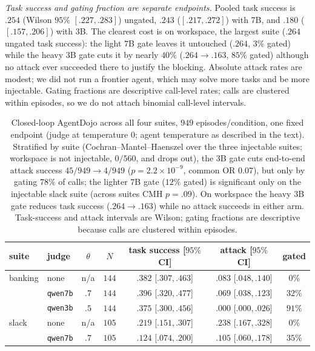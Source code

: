 \emph{Task success and gating fraction are separate endpoints.} Pooled task
success is $.254$ (Wilson $95\%$ $[.227,.283]$) ungated, $.243$
($[.217,.272]$) with 7B, and $.180$ ($[.157,.206]$) with 3B. The clearest cost is on
workspace, the largest suite ($.264$ ungated task success): the light $7$B gate
leaves it untouched ($.264$, $3\%$ gated) while the heavy $3$B gate cuts it by nearly
$40\%$ ($.264\to.163$, $85\%$ gated) although no attack ever succeeded there
to justify the blocking. Absolute attack rates are modest; we did not run a frontier agent, which may
solve more tasks and be more injectable. Gating fractions
are descriptive call-level rates; calls are clustered within episodes, so we do
not attach binomial call-level intervals.

\begin{table}[h]
\caption{Closed-loop AgentDojo across all four suites, $949$ episodes/condition, one fixed
endpoint (judge at temperature $0$; agent temperature as described in the text). Stratified by suite (Cochran--Mantel--Haenszel over the three
injectable suites; workspace is not injectable, $0/560$, and drops out), the $3$B gate
cuts end-to-end attack success $45/949\to4/949$ ($p=2.2\times10^{-9}$, common OR $0.07$),
but only by gating $78\%$ of calls; the lighter $7$B gate ($12\%$ gated) is significant
only on the injectable slack suite (across suites CMH $p=.09$). On workspace the heavy
$3$B gate reduces task success ($.264\to.163$) while no attack succeeds in
either arm. Task-success and attack intervals are Wilson; gating fractions are
descriptive because calls are clustered within episodes.}
\label{S-tab:loop}
\centering\scriptsize\setlength{\tabcolsep}{2pt}
\begin{tabular}{@{}llccccc@{}}
\toprule
suite & judge & $\theta$ & $N$ & task success [$95\%$ CI] & attack [$95\%$ CI] & gated \\
\midrule
banking & none & n/a & $144$ & $.382$ [$.307,.463$] & $.083$ [$.048,.140$] & $0\%$ \\
        & \texttt{qwen7b} & $.7$ & $144$ & $.396$ [$.320,.477$] & $.069$ [$.038,.123$] & $32\%$ \\
        & \texttt{qwen3b} & $.5$ & $144$ & $.375$ [$.300,.456$] & $.000$ [$.000,.026$] & $91\%$ \\
\midrule
slack & none & n/a & $105$ & $.219$ [$.151,.307$] & $.238$ [$.167,.328$] & $0\%$ \\
      & \texttt{qwen7b} & $.7$ & $105$ & $.124$ [$.074,.200$] & $.105$ [$.060,.178$] & $35\%$ \\

\end{tabular}
\end{table}
